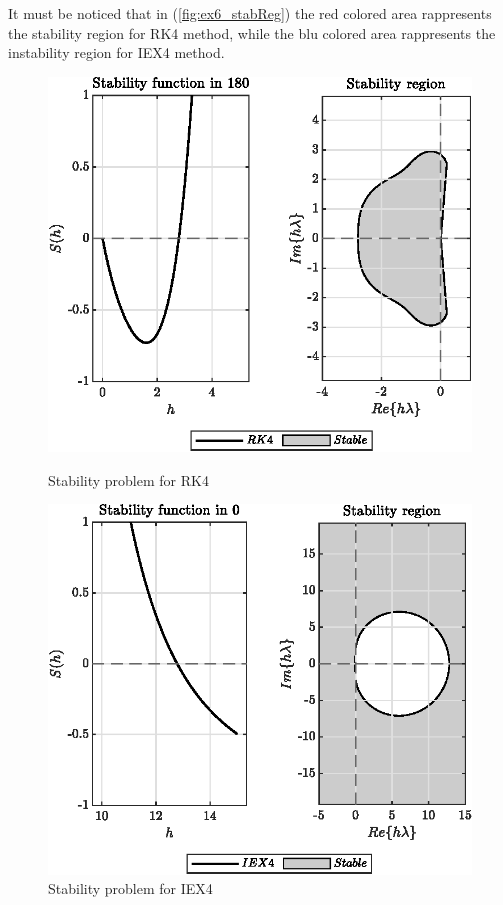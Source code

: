 \documentclass[11pt,a4paper,oneside]{article}
\begin{document}
It must be noticed that in (\cref{fig:ex6_stabReg}) the red colored area rappresents the stability region for RK4 method, while the blu colored area rappresents the instability region for IEX4 method.
\begin{figure}[htb]
    \centering
    \begin{minipage}{0.45\textwidth}
        \centering
        \includegraphics*[width=\textwidth, keepaspectratio]{ex6_rk4.eps}
        \caption[]{\label{fig:ex6_rk4} Stability problem for RK4}
    \end{minipage}
    \hspace{0.05\textwidth}
    \begin{minipage}{0.45\textwidth}
        \centering
        \includegraphics*[width=\textwidth, keepaspectratio]{ex6_iex4.eps}
        \caption[]{\label{fig:ex6_iex4} Stability problem for IEX4}
    \end{minipage}
\end{figure}
\end{document}
